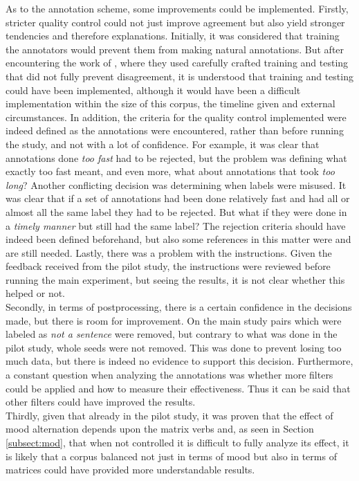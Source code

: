 As to the annotation scheme, some improvements could be implemented. Firstly, stricter quality control could not just improve agreement but also yield stronger tendencies and therefore explanations. Initially, it was considered that training the annotators would prevent them from making natural annotations. But after encountering the work of \citet{nie2020can}, where they used carefully crafted training and testing that did not fully prevent disagreement, it is understood that training and testing could have been implemented, although it would have been a difficult implementation within the size of this corpus, the timeline given and external circumstances. In addition, the criteria for the quality control implemented were indeed defined as the annotations were encountered, rather than before running the study, and not with a lot of confidence. For example, it was clear that annotations done \textit{too fast} had to be rejected, but the problem was defining what exactly too fast meant, and even more, what about annotations that took \textit{too long}? Another conflicting decision was determining when labels were misused. It was clear that if a set of annotations had been done relatively fast and had all or almost all the same label they had to be rejected. But what if they were done in a \textit{timely manner} but still had the same label? The rejection criteria should have indeed been defined beforehand, but also some references in this matter were and are still needed. Lastly, there was a problem with the instructions. Given the feedback received from the pilot study, the instructions were reviewed before running the main experiment, but seeing the results, it is not clear whether this helped or not.\\

Secondly, in terms of postprocessing, there is a certain confidence in the decisions made, but there is room for improvement. On the main study pairs which were labeled as \textit{not a sentence} were removed, but contrary to what was done in the pilot study, whole seeds were not removed. This was done to prevent losing too much data, but there is indeed no evidence to support this decision. Furthermore, a constant question when analyzing the annotations was whether more filters could be applied and how to measure their effectiveness. Thus it can be said that other filters could have improved the results.\\

Thirdly, given that already in the pilot study, it was proven that the effect of mood alternation depends upon the matrix verbs and, as seen in Section \ref{subsect:mod}, that when not controlled it is difficult to fully analyze its effect, it is likely that a corpus balanced not just in terms of mood but also in terms of matrices could have provided more understandable results.\\

